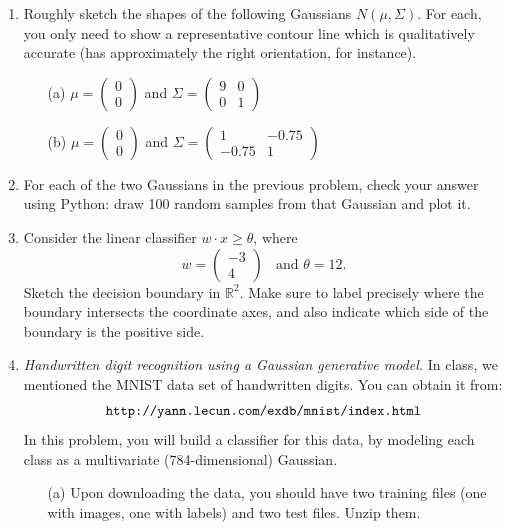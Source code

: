 \documentclass[10pt]{report}
\theoremstyle{plain}
\theoremstyle{definition}
\newcommand{\R}{\mathbb{R}}
\begin{document}
\begin{enumerate}
\item Roughly sketch the shapes of the following Gaussians $N(\mu,\Sigma)$. For each, you only need to show a representative contour line which is qualitatively accurate (has approximately the right orientation, for instance).
\begin{enumerate}
\item[(a)] $\mu = \left( \begin{array}{c} 0 \\ 0 \end{array} \right)$ and $\Sigma = \left( \begin{array}{cc} 9 & 0 \\ 0 & 1 \end{array} \right)$
\item[(b)] $\mu = \left( \begin{array}{c} 0 \\ 0 \end{array} \right)$ and $\Sigma = \left( \begin{array}{cc} 1 & -0.75 \\ -0.75 & 1 \end{array} \right)$
\end{enumerate}


\item For each of the two Gaussians in the previous problem, check your answer using Python: draw 100 random samples from that Gaussian and plot it.
  
\item Consider the linear classifier $w \cdot x \geq \theta$, where
$$ w = \left( \begin{array}{c}-3 \\ 4\end{array} \right) \ \ \ \ \mbox{and\ \ \ } \theta = 12 .$$
  Sketch the decision boundary in $\R^2$. Make sure to label precisely where the boundary intersects the coordinate axes, and also indicate which side of the boundary is the positive side.
  
\item {\it Handwritten digit recognition using a Gaussian generative model.} In class, we mentioned the MNIST data set of handwritten digits. You can obtain it from:
  $$ \mbox{\tt http://yann.lecun.com/exdb/mnist/index.html} $$
In this problem, you will build a classifier for this data, by modeling each class as a multivariate (784-dimensional) Gaussian.

\begin{enumerate}
\item[(a)] Upon downloading the data, you should have two training files (one with images, one with labels) and two test files. Unzip them.


\end{enumerate}
\end{enumerate}
\end{document}
